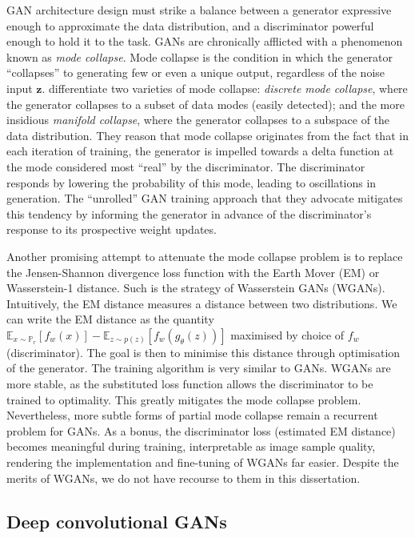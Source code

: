 GAN architecture design must strike a balance between a generator expressive enough to approximate the data distribution, and a discriminator powerful enough to hold it to the task. GANs are chronically afflicted with a phenomenon known as \emph{mode collapse}. Mode collapse is the condition in which the generator ``collapses'' to generating few or even a unique output, regardless of the noise input $\mathbf{z}$. \cite{metz2016unrolled} differentiate two varieties of mode collapse: \emph{discrete mode collapse}, where the generator collapses to a subset of data modes (easily detected); and the more insidious \emph{manifold collapse}, where the generator collapses to a subspace of the data distribution. They reason that mode collapse originates from the fact that in each iteration of training, the generator is impelled towards a delta function at the mode considered most ``real'' by the discriminator. The discriminator responds by lowering the probability of this mode, leading to oscillations in generation. The ``unrolled'' GAN training approach that they advocate mitigates this tendency by informing the generator in advance of the discriminator's response to its prospective weight updates.

Another promising attempt to attenuate the mode collapse problem is to replace the Jensen-Shannon divergence loss function with the Earth Mover (EM) or Wasserstein-1 distance. Such is the strategy of Wasserstein GANs (WGANs). Intuitively, the EM distance measures a distance between two distributions. We can write the EM distance as the quantity $\mathbb{E}_{x \sim \mathbb{P}_r}[f_w(x)] - \mathbb{E}_{z\sim p(z)}[f_w(g_{\theta}(z))]$ maximised by choice of $f_w$ (discriminator). The goal is then to minimise this distance through optimisation of the generator. The training algorithm is very similar to GANs. WGANs are more stable, as the substituted loss function allows the discriminator to be trained to optimality. This greatly mitigates the mode collapse problem. Nevertheless, more subtle forms of partial mode collapse remain a recurrent problem for GANs. As a bonus, the discriminator loss (estimated EM distance) becomes meaningful during training, interpretable as image sample quality, rendering the implementation and fine-tuning of WGANs far easier. Despite the merits of WGANs, we do not have recourse to them in this dissertation.

\subsection{Deep convolutional GANs}

